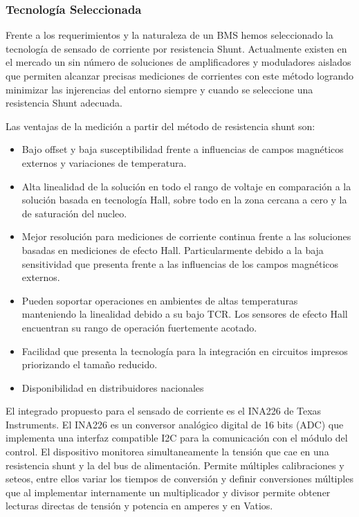 \documentclass[10pt,a4paper]{article}
\begin{document}
\subsubsection{Tecnología Seleccionada}

Frente a los requerimientos y la naturaleza de un BMS hemos seleccionado la tecnología de sensado de corriente por resistencia Shunt. Actualmente existen en el mercado un sin número de soluciones de amplificadores y moduladores aislados que permiten alcanzar precisas mediciones de corrientes con este método logrando minimizar las injerencias del entorno siempre y cuando se seleccione una resistencia Shunt adecuada.

Las ventajas de la medición a partir del método de resistencia shunt son:

\begin{itemize}
	\item Bajo offset y baja susceptibilidad frente a influencias de campos magnéticos externos y variaciones de temperatura.
	\item Alta linealidad de la solución en todo el rango de voltaje en comparación a la solución basada en tecnología Hall, sobre todo en la zona cercana a cero y la de saturación del nucleo. 
	\item Mejor resolución para mediciones de corriente continua frente a las soluciones basadas en mediciones de efecto Hall. Particularmente debido a la baja sensitividad que presenta frente a las influencias de los campos magnéticos externos.
	\item Pueden soportar operaciones en ambientes de altas temperaturas manteniendo la linealidad debido a su bajo TCR. Los sensores de efecto Hall encuentran su rango de operación fuertemente acotado.
	\item Facilidad que presenta la tecnología para la integración en circuitos impresos priorizando el tamaño reducido.
	\item Disponibilidad en distribuidores nacionales
\end{itemize}

El integrado propuesto para el sensado de corriente es el INA226 de Texas Instruments. El INA226 es un conversor analógico digital de 16 bits (ADC) que implementa una interfaz compatible I2C para la comunicación con el módulo del control. El dispositivo monitorea simultaneamente la tensión que cae en una resistencia shunt y la del bus de alimentación. Permite múltiples calibraciones y seteos, entre ellos variar los tiempos de conversión y definir conversiones múltiples que al implementar internamente un multiplicador y divisor permite obtener lecturas directas de tensión y potencia en amperes y en Vatios.
\end{document}
